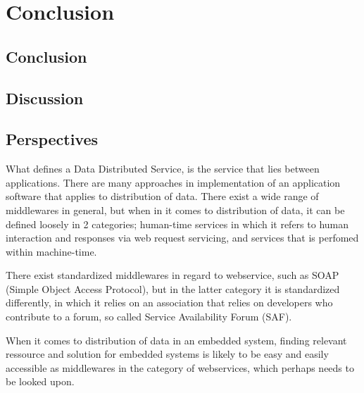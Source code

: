 \chapter{Conclusion}
\section{Conclusion}

\section{Discussion}

\section{Perspectives}
What defines a Data Distributed Service, is the service that lies between applications. There are many approaches in implementation of an application software that applies to distribution of data. There exist a wide range of middlewares in general, but when in it comes to distribution of data, it can be defined loosely in 2 categories; human-time services in which it refers to human interaction and responses via web request servicing, and services that is perfomed within machine-time.

There exist standardized middlewares in regard to webservice, such as SOAP (Simple Object Access Protocol), but in the latter category it is standardized differently, in which it relies on an association that relies on developers who contribute to a forum, so called Service Availability Forum (SAF).

When it comes to distribution of data in an embedded system, finding relevant ressource and solution for embedded systems is likely to be easy and easily accessible as middlewares in the category of webservices, which perhaps needs to be looked upon.